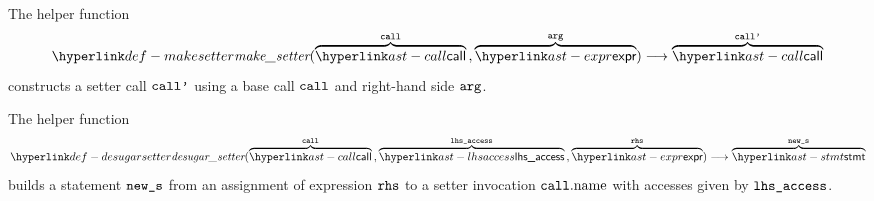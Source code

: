 \hypertarget{def-makesetter}{}
The helper function
\[
\makesetter(
  \overname{\call}{\vcall} \aslsep
  \overname{\expr}{\varg}) \aslto \overname{\call}{\vcallp}
\]
constructs a setter call $\vcallp$ using a base call $\vcall$ and right-hand side $\varg$.

\begin{mathpar}
\end{mathpar}

\hypertarget{def-desugarsetter}{}
The helper function
\[
\desugarsetter(
  \overname{\call}{\vcall} \aslsep
  \overname{\lhsaccess}{\vlhsaccess} \aslsep
  \overname{\expr}{\rhs}) \aslto \overname{\stmt}{\news}
\]
builds a statement $\news$ from an assignment of expression $\rhs$ to a setter invocation $\vcall.\callname$ with accesses given by $\vlhsaccess$.

\begin{mathpar}
\end{mathpar}

\begin{mathpar}
\end{mathpar}


